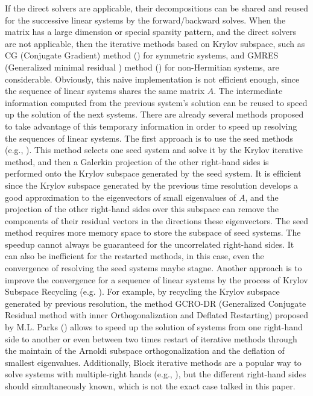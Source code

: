 If the direct solvers are applicable, their decompositions can be shared and reused for the successive linear systems by the forward/backward solves. When the matrix has a large dimension or special sparsity pattern, and the direct solvers are not applicable, then the iterative methods based on Krylov subspace, such as CG (Conjugate Gradient) method (\cite{kershaw1978incomplete}) for symmetric systems, and GMRES (Generalized minimal residual ) method (\cite{saad1986gmres}) for non-Hermitian systems, are considerable. Obviously, this naive implementation is not efficient enough, since the sequence of linear systems shares the same matrix $A$. The intermediate information computed from the previous system's solution can be reused to speed up the solution of the next systems. There are already several methods proposed to take advantage of this temporary information in order to speed up resolving the sequences of linear systems. The first approach is to use the seed methods (e.g., \cite{saad1987lanczos,papadrakakis1990new,smith1989conjugate,gu2002seed,simoncini1995iterative,abdel2014improved}). This method selects one seed system and solve it by the Krylov iterative method, and then a Galerkin projection of the other right-hand sides is performed onto the Krylov subspace generated by the seed system. It is efficient since the Krylov subspace generated by the previous time resolution develops a good approximation to the eigenvectors of small eigenvalues of $A$, and the projection of the other right-hand sides over this subspace can remove the components of their residual vectors in the directions these eigenvectors. The seed method requires more memory space to store the subspace of seed systems. The speedup cannot always be guaranteed for the uncorrelated right-hand sides.  It can also be inefficient for the restarted methods, in this case, even the convergence of resolving the seed systems maybe stagne. Another approach is to improve the convergence for a sequence of linear systems by the process of Krylov Subspace Recycling (e.g. \cite{parks2006recycling,jolivet2016block,kilmer2006recycling,ye2008generalized}). For example, by recycling the Krylov subspace generated by previous resolution, the method GCRO-DR (Generalized Conjugate Residual method with inner Orthogonalization
and Deflated Restarting) proposed by M.L. Parks (\cite{parks2006recycling}) allows to speed up the solution of systems from one right-hand side to another or even between two times restart of iterative methods through the maintain of the Arnoldi subspace orthogonalization and the deflation of smallest eigenvalues. Additionally, Block iterative methods are a popular way to solve systems with multiple-right hands (e.g., \cite{simoncini1995iterative,calvetti1994application, baker2006improving,gutknecht2006block}), but the different right-hand sides should simultaneously known, which is not the exact case talked in this paper. 

